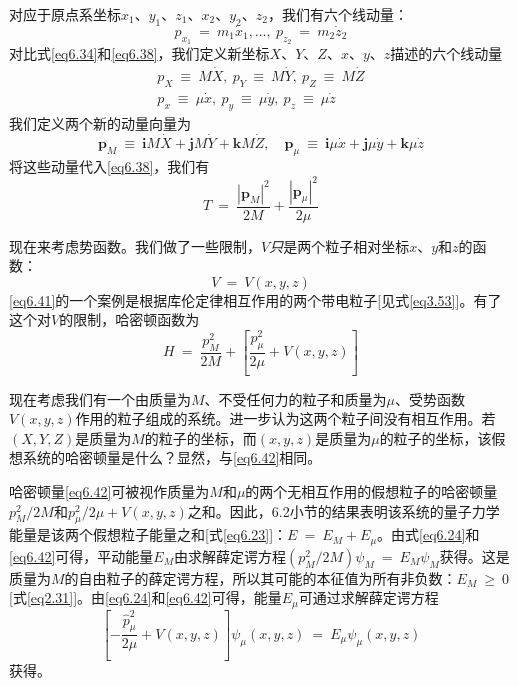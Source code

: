 \documentclass[12pt,a4paper,openany]{ctexbook}
\newcommand{\abs}[1]{\left| #1 \right|}
\begin{document}
\begin{flushleft}
对应于原点系坐标$x_1$、$y_1$、$z_1$、$x_2$、$y_2$、$z_2$，我们有六个线动量：
\begin{equation}
    p_{x_1}\ =\ m_1\dot{x}_1,\dots,\ p_{z_2}\ =\ m_2\dot{z}_2 \label{eq6.39}
\end{equation}
对比式\eqref{eq6.34}和\eqref{eq6.38}，我们定义新坐标$X$、$Y$、$Z$、$x$、$y$、$z$描述的六个线动量
\begin{gather*}
    p_X\ \equiv\ M\dot{X},\ p_Y\ \equiv\ M\dot{Y},\ p_Z\ \equiv\ M\dot{Z} \\
    p_x\ \equiv\ \mu\dot{x},\ p_y\ \equiv\ \mu\dot{y},\ p_z\ \equiv\ \mu\dot{z}
\end{gather*}
我们定义两个新的动量向量为
\begin{equation*}
    \boldsymbol{p}_M\ \equiv\ \boldsymbol{i}M\dot{X}+\boldsymbol{j}M\dot{Y}+\boldsymbol{k}M\dot{Z},\quad\boldsymbol{p}_\mu\ \equiv\ \boldsymbol{i}\mu\dot{x}+\boldsymbol{j}\mu\dot{y}+\boldsymbol{k}\mu\dot{z}
\end{equation*}
将这些动量代入\eqref{eq6.38}，我们有
\begin{equation}
    T\ =\ \frac{\abs{\boldsymbol{p}_M}^2}{2M}+\frac{\abs{\boldsymbol{p}_\mu}^2}{2\mu} \label{eq6.40}
\end{equation}

现在来考虑势函数。我们做了一些限制，$V$\textit{只}是两个粒子相对坐标$x$、$y$和$z$的函数：
\begin{equation}
    V\ =\ V(x,y,z) \label{eq6.41}
\end{equation}
\eqref{eq6.41}的一个案例是根据库伦定律相互作用的两个带电粒子[见式\eqref{eq3.53}]。有了这个对$V$的限制，哈密顿函数为
\begin{equation}
    H\ =\ \frac{p_M^2}{2M}+[\frac{p_\mu^2}{2\mu}+V(x,y,z)] \label{eq6.42}
\end{equation}

现在考虑我们有一个由质量为$M$、不受任何力的粒子和质量为$\mu$、受势函数$V(x,y,z)$作用的粒子组成的系统。进一步认为这两个粒子间没有相互作用。若$(X,Y,Z)$是质量为$M$的粒子的坐标，而$(x,y,z)$是质量为$\mu$的粒子的坐标，该假想系统的哈密顿量是什么？显然，与\eqref{eq6.42}相同。

哈密顿量\eqref{eq6.42}可被视作质量为$M$和$\mu$的两个无相互作用的假想粒子的哈密顿量$p_M^2/2M$和$p_\mu^2/2\mu+V(x,y,z)$之和。因此，6.2小节的结果表明该系统的量子力学能量是该两个假想粒子能量之和[式\eqref{eq6.23}]：$E\ =\ E_M+E_{\mu}$。由式\eqref{eq6.24}和\eqref{eq6.42}可得，平动能量$E_M$由求解薛定谔方程$(p_M^2/2M)\psi_M\ =\ E_M\psi_M$获得。这是质量为$M$的自由粒子的薛定谔方程，所以其可能的本征值为所有非负数：$E_M\ \geq\ 0$[式\eqref{eq2.31}]。由\eqref{eq6.24}和\eqref{eq6.42}可得，能量$E_{\mu}$可通过求解薛定谔方程
\begin{equation}
    \left[-\frac{\hat{p}_{\mu}^2}{2\mu}+V(x,y,z)\right]\psi_\mu(x,y,z)\ =\ E_\mu\psi_\mu(x,y,z) \label{eq6.43}
\end{equation}
获得。


\end{flushleft}
\end{document}
